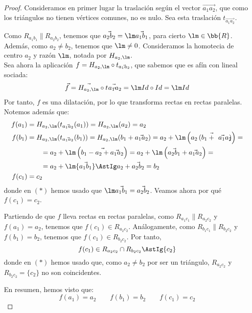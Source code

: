 \begin{proof}
    Consideramos en primer lugar la traslación según el vector
    $\vec{a_1a_2}$, que como los triángulos no tienen vértices comunes, no es nulo. Sea esta traslación $t_{\vec{a_1a_2}}$.

    Como $R_{a_1b_1}\|R_{a_2b_2}$, tenemos que $\vec{a_2b_2}=\lm \vec{a_1b_1}$, para cierto $\lm\in \bb{R}$.
    Además, como $a_2\neq b_2$, tenemos que $\lm\neq 0$. Consideramos la
    homotecia de centro $a_2$ y razón $\lm$, notada por $H_{a_2, \lm}$.\\

    Sea ahora la aplicación $f=H_{a_2, \lm}\circ t_{\vec{a_1a_2}}$, que sabemos que es afín con lineal sociada:
    \begin{equation*}
        \vec{f} = \vec{H_{a_2, \lm}}\circ \vec{t_{\vec{a_1a_2}}} = \lm Id \circ Id = \lm Id
    \end{equation*}
    Por tanto, $f$ es una dilatación, por lo que transforma rectas en rectas paralelas. Notemos además que:
    \begin{align*}
        f(a_1) &= H_{a_2, \lm}(t_{\vec{a_1a_2}}(a_1)) = H_{a_2, \lm}(a_2) = a_2\\
        f(b_1) &= H_{a_2, \lm}(t_{\vec{a_1a_2}}(b_1)) = H_{a_2, \lm}(b_1+\vec{a_1a_2})
                = a_2+\lm \left(\vec{a_2\left(b_1+\vec{a_1a_2}\right)}\right) = \\
               &\qquad = a_2+\lm \left(\vec{b_1-a_2+\vec{a_1a_2}}\right)
               = a_2+\lm \left({\vec{a_2b_1}+\vec{a_1a_2}}\right) =\\
               &\qquad = a_2+\lm {\vec{a_1b_1}} \AstIg a_2 + \vec{a_2b_2} = b_2\\
        f(c_1) &= c_2
    \end{align*}
    donde en $(\ast)$ hemos usado que $\lm \vec{a_1b_1}=\vec{a_2b_2}$. Veamos ahora por qué $f(c_1)=c_2$.

    Partiendo de que $f$ lleva rectas en rectas paralelas,
    como $R_{a_1c_1}\|R_{a_2c_2}$ y $f(a_1)=a_2$, tenemos que $f(c_1)\in R_{a_2c_2}$.
    Análogamente, como $R_{b_1c_1}\|R_{b_2c_2}$ y $f(b_1)=b_2$, tenemos que $f(c_1)\in R_{b_2c_2}$. Por tanto,
    \begin{equation*}
        f(c_1)\in R_{a_2c_2}\cap R_{b_2c_2} \AstIg \{c_2\}
    \end{equation*}
    donde en $(\ast)$ hemos usado que, como $a_2\neq b_2$ por ser un triángulo, $R_{a_2c_2}$ y $R_{b_2c_2}=\{c_2\}$ no son coincidentes.
    
    En resumen, hemos visto que:
    \begin{equation*}
        f(a_1)=a_2 \qquad f(b_1)=b_2 \qquad f(c_1)=c_2
    \end{equation*}
    

\end{proof}
